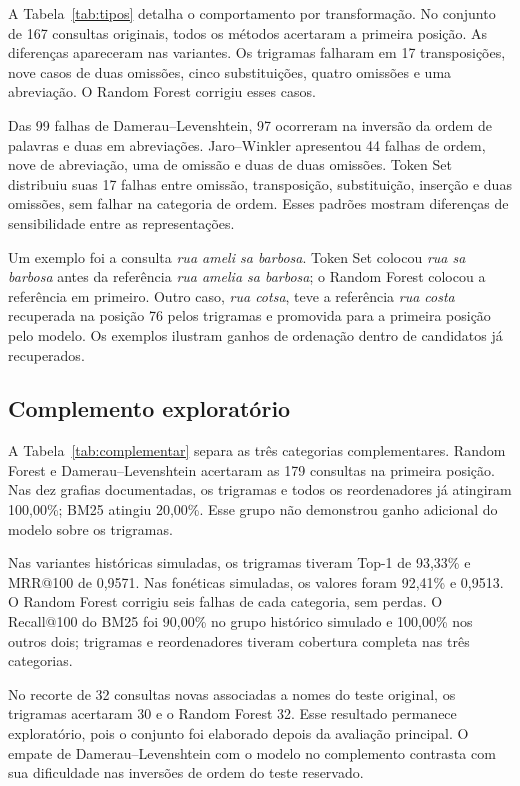 

A Tabela~\ref{tab:tipos} detalha o comportamento por transformação. No conjunto de 167 consultas originais, todos os métodos acertaram a primeira posição. As diferenças apareceram nas variantes. Os trigramas falharam em 17 transposições, nove casos de duas omissões, cinco substituições, quatro omissões e uma abreviação. O Random Forest corrigiu esses casos.



Das 99 falhas de Damerau--Levenshtein, 97 ocorreram na inversão da ordem de palavras e duas em abreviações. Jaro--Winkler apresentou 44 falhas de ordem, nove de abreviação, uma de omissão e duas de duas omissões. Token Set distribuiu suas 17 falhas entre omissão, transposição, substituição, inserção e duas omissões, sem falhar na categoria de ordem. Esses padrões mostram diferenças de sensibilidade entre as representações.

Um exemplo foi a consulta \emph{rua ameli sa barbosa}. Token Set colocou \emph{rua sa barbosa} antes da referência \emph{rua amelia sa barbosa}; o Random Forest colocou a referência em primeiro. Outro caso, \emph{rua cotsa}, teve a referência \emph{rua costa} recuperada na posição 76 pelos trigramas e promovida para a primeira posição pelo modelo. Os exemplos ilustram ganhos de ordenação dentro de candidatos já recuperados.

\subsection{Complemento exploratório}

A Tabela~\ref{tab:complementar} separa as três categorias complementares. Random Forest e Damerau--Levenshtein acertaram as 179 consultas na primeira posição. Nas dez grafias documentadas, os trigramas e todos os reordenadores já atingiram 100,00\%; BM25 atingiu 20,00\%. Esse grupo não demonstrou ganho adicional do modelo sobre os trigramas.



Nas variantes históricas simuladas, os trigramas tiveram Top-1 de 93,33\% e MRR@100 de 0,9571. Nas fonéticas simuladas, os valores foram 92,41\% e 0,9513. O Random Forest corrigiu seis falhas de cada categoria, sem perdas. O Recall@100 do BM25 foi 90,00\% no grupo histórico simulado e 100,00\% nos outros dois; trigramas e reordenadores tiveram cobertura completa nas três categorias.

No recorte de 32 consultas novas associadas a nomes do teste original, os trigramas acertaram 30 e o Random Forest 32. Esse resultado permanece exploratório, pois o conjunto foi elaborado depois da avaliação principal. O empate de Damerau--Levenshtein com o modelo no complemento contrasta com sua dificuldade nas inversões de ordem do teste reservado.

